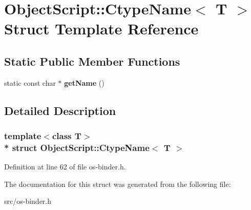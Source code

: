 \hypertarget{struct_object_script_1_1_ctype_name}{}\section{Object\+Script\+:\+:Ctype\+Name$<$ T $>$ Struct Template Reference}
\label{struct_object_script_1_1_ctype_name}
\subsection*{Static Public Member Functions}
\begin{DoxyCompactItemize}
\item 
static const char $\ast$ {\bfseries get\+Name} ()\hypertarget{struct_object_script_1_1_ctype_name_ae44426e791cbd28ac838a7f51ab75a0b}{}\label{struct_object_script_1_1_ctype_name_ae44426e791cbd28ac838a7f51ab75a0b}

\end{DoxyCompactItemize}


\subsection{Detailed Description}
\subsubsection*{template$<$class T$>$\\*
struct Object\+Script\+::\+Ctype\+Name$<$ T $>$}



Definition at line 62 of file os-\/binder.\+h.



The documentation for this struct was generated from the following file\+:\begin{DoxyCompactItemize}
\item 
src/os-\/binder.\+h\end{DoxyCompactItemize}
